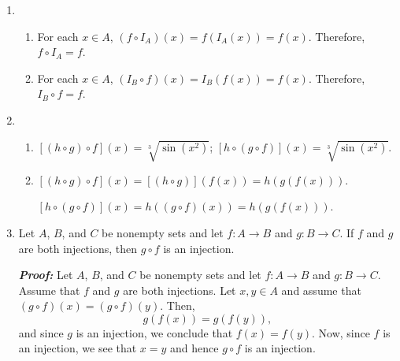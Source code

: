 \begin{enumerate}
\item \begin{enumerate}
\item For each  $x \in A$, $\left( {f \circ I_A } \right)\left( x \right) = f\left( {I_A \left( x \right)} \right) = f\left( x \right)$.  Therefore, $f \circ I_A  = f$.

\item For each  $x \in A$, $\left( {I_B \circ f } \right)\left( x \right) = I_B \left( {f \left( x \right)} \right) = f\left( x \right)$.  Therefore, $I_B \circ f  = f$.
\end{enumerate}


\item \begin{enumerate}
\item $\left[ {\left( {h \circ g} \right) \circ f} \right]\left( x \right) = \sqrt[3]{{\sin \left( {x^2 } \right)}}$; 
$\left[ {h \circ \left( {g \circ f} \right)} \right]\left( x \right) = \sqrt[3]{{\sin \left( {x^2 } \right)}}$.

\item 
$\left[ {\left( {h \circ g} \right) \circ f} \right]\left( x \right) 
  = \left[ \left( {h \circ g} \right) \right] \left( f \left( x \right) \right)
  = h \left( g \left( f \left( x \right) \right) \right).$

$\left[ {h \circ \left( {g \circ f} \right)} \right]\left( x \right) 
  = h \left( \left( g \circ f \right) \left( x \right) \right) 
  = h \left( g \left( f \left( x \right) \right) \right)$. 
\end{enumerate}



\item Let  $A$, $B$, and  $C$  be nonempty sets and let  $f:A \to B$  and  $g:B \to C$.  If  $f$  and  $g$  are both injections, then  $g \circ f$  is an injection. 

\textbf{\emph{Proof:}} Let  $A$, $B$, and  $C$  be nonempty sets and let  $f:A \to B$  and  
$g:B \to C$.  Assume that $f$  and  $g$  are both injections.  Let  $x, y \in A$ and assume that  
$\left( {g \circ f} \right)\left( x \right) = \left( {g \circ f} \right)\left( y \right)$.  Then,
\[
g \left( f \left( x \right) \right) = g \left( f \left( y \right) \right),
\] 
and since $g$ is an injection, we conclude that $f \left( x \right) = f \left( y \right)$.  Now, since $f$ is an injection, we see that $x = y$ and hence $g \circ f$ is an injection.






\end{enumerate}
